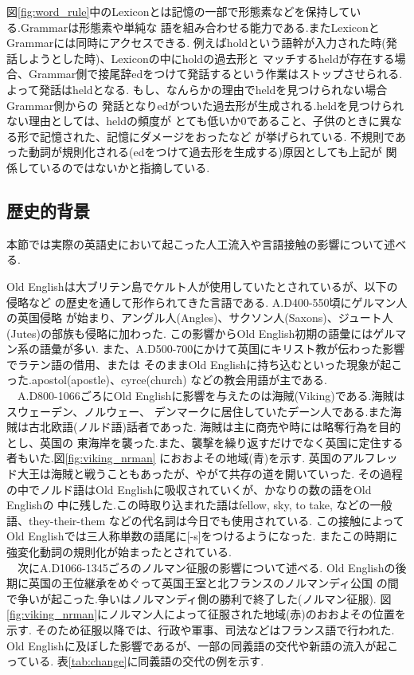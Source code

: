 図\ref{fig:word_rule}中のLexiconとは記憶の一部で形態素などを保持している.Grammarは形態素や単純な
語を組み合わせる能力である.またLexiconとGrammarには同時にアクセスできる.
例えばholdという語幹が入力された時(発話しようとした時)、Lexiconの中にholdの過去形と
マッチするheldが存在する場合、Grammar側で接尾辞edをつけて発話するという作業はストップさせられる.
よって発話はheldとなる. もし、なんらかの理由でheldを見つけられない場合Grammar側からの
発話となりedがついた過去形が生成される.heldを見つけられない理由としては、heldの頻度が
とても低いか0であること、子供のときに異なる形で記憶された、記憶にダメージをおったなど
が挙げられている.
不規則であった動詞が規則化される(edをつけて過去形を生成する)原因としても上記が
関係しているのではないかと指摘している.



\subsection{歴史的背景}\label{sec:history_back}
本節では実際の英語史において起こった人工流入や言語接触の影響\cite{english_div, philip, ziten}について述べる.

Old Englishは大ブリテン島でケルト人が使用していたとされているが、以下の侵略など
の歴史を通して形作られてきた言語である.
A.D400-550頃にゲルマン人の英国侵略
が始まり、アングル人(Angles)、サクソン人(Saxons)、ジュート人(Jutes)の部族も侵略に加わった\cite{ziten}.
この影響からOld English初期の語彙にはゲルマン系の語彙が多い.
また、A.D500-700にかけて英国にキリスト教が伝わった影響でラテン語の借用、または
そのままOld Englishに持ち込むといった現象が起こった.apostol(apostle)、cyrce(church)
などの教会用語が主である.\\
　A.D800-1066ごろにOld Englishに影響を与えたのは海賊(Viking)である.海賊はスウェーデン、ノルウェー、
デンマークに居住していたデーン人である.また海賊は古北欧語(ノルド語)話者であった.
海賊は主に商売や時には略奪行為を目的とし、英国の
東海岸を襲った.また、襲撃を繰り返すだけでなく英国に定住する者もいた.図\ref{fig:viking_nrman}
におおよその地域(青)を示す.
英国のアルフレッド大王は海賊と戦うこともあったが、やがて共存の道を開いていった.
その過程の中でノルド語はOld Englishに吸収されていくが、かなりの数の語をOld Englishの
中に残した.この時取り込まれた語はfellow, sky, to take, などの一般語、they-their-them
などの代名詞は今日でも使用されている.
この接触によってOld Englishでは三人称単数の語尾に[-s]をつけるようになった.
またこの時期に強変化動詞の規則化が始まったとされている.\\

　次にA.D1066-1345ごろのノルマン征服の影響について述べる.
Old Englishの後期に英国の王位継承をめぐって英国王室と北フランスのノルマンディ公国
の間で争いが起こった.争いはノルマンディ側の勝利で終了した(ノルマン征服).
図\ref{fig:viking_nrman}にノルマン人によって征服された地域(赤)のおおよその位置を示す.
そのため征服以降では、行政や軍事、司法などはフランス語で行われた.
Old Englishに及ぼした影響であるが、一部の同義語の交代や新語の流入が起こっている.
表\ref{tab:change}に同義語の交代の例を示す.

